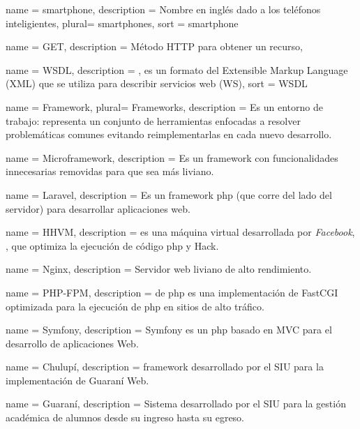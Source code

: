  {
  name = {smartphone},
  description = {Nombre en inglés dado a los teléfonos inteligientes},
  plural= {smartphones},
  sort = {smartphone}
}

 {
  name = {GET},
  description = {Método HTTP para obtener un recurso},
}

 {
  name = {WSDL},
  description = {, es un formato del Extensible Markup Language (XML) que se utiliza para describir servicios web (WS)},
  sort = {WSDL}
}

 {
  name = {Framework},
  plural= {Frameworks},
  description = {Es un entorno de trabajo: representa un conjunto de herramientas enfocadas a resolver problemáticas comunes evitando reimplementarlas en cada nuevo desarrollo.}
}

 {
  name = {Microframework},
  description = {Es un \gls{framework} con funcionalidades innecesarias removidas para que sea más liviano.}
}


 {
  name = {Laravel},
  description = {Es un \gls{framework} \gls{php} (que corre del lado del servidor) para desarrollar aplicaciones web.}
}

 {
  name = {HHVM},
  description = { es una máquina virtual desarrollada por \textit{Facebook}, , que optimiza la ejecución de código \gls{php} y Hack.}
}


 {
  name = {Nginx},
  description = {Servidor web liviano de alto rendimiento.}
}

 {
  name = {PHP-FPM},
  description = { de \gls{php} es una implementación de FastCGI optimizada para la ejecución de \gls{php} en sitios de alto tráfico.}
}

 {
  name = {Symfony},
  description = {Symfony es un  \gls{php} basado en MVC para el desarrollo de aplicaciones Web.}
}

 {
  name = {Chulupí},
  description = {\gls{framework} desarrollado por el SIU para la implementación de Guaraní Web.}
}

 {
  name = {Guaraní},
  description = {Sistema desarrollado por el SIU para la gestión académica de alumnos desde su ingreso hasta su egreso.}
}


